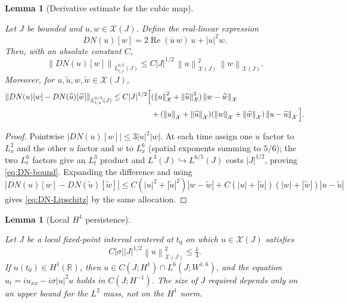 \documentclass[11pt,oneside]{book}
\providecommand{\uses}[1]{}
\newtheorem{lemma}[theorem]{Lemma}
\theoremstyle{definition}
\theoremstyle{remark}
\newcommand{\R}{\mathbb R}
\newcommand{\1}{\mathbf 1}
\newcommand{\Rea}{\operatorname{Re}}
\newcommand{\norm}[1]{\left\lVert #1\right\rVert}
\begin{document}
\begin{lemma}[Derivative estimate for the cubic map]
\label{lem:cubic-derivative-map}
\uses{def:fixed-point-space}
Let $J$ be bounded and $u,w\in\mathcal X(J)$. Define the real-linear expression
\[
 DN(u)[w]=2\Rea(\overline u\,w)\,u+|u|^2w.
\]
Then, with an absolute constant $C$,
\begin{equation}
 \norm{DN(u)[w]}_{L^{6/5}_{t,x}(J)}
 \le C|J|^{1/2}\,\norm u_{\mathcal X(J)}^2\,\norm w_{\mathcal X(J)}.
                                                    \label{eq:DN-bound}
\end{equation}
Moreover, for $u,\widetilde u,w,\widetilde w\in\mathcal X(J)$,
\begin{align}
 \norm{DN(u)[w]-DN(\widetilde u)[\widetilde w]}_{L^{6/5}_{t,x}(J)}
 \le C|J|^{1/2}\Big[&
 (\norm u_{\mathcal X}^2+\norm{\widetilde u}_{\mathcal X}^2)
 \norm{w-\widetilde w}_{\mathcal X}\notag\\
 &+(\norm u_{\mathcal X}+\norm{\widetilde u}_{\mathcal X})
 (\norm w_{\mathcal X}+\norm{\widetilde w}_{\mathcal X})
 \norm{u-\widetilde u}_{\mathcal X}\Big].          \label{eq:DN-Lipschitz}
\end{align}
\end{lemma}

\begin{proof}
\uses{lem:cubic-65}
Pointwise $|DN(u)[w]|\le 3|u|^2|w|$. At each time assign one $u$ factor to
$L^2_x$ and the other $u$ factor and $w$ to $L^6_x$ (spatial exponents summing
to $5/6$); the two $L^6_t$ factors give an $L^3_t$ product and
$L^3(J)\hookrightarrow L^{6/5}(J)$ costs $|J|^{1/2}$, proving
\eqref{eq:DN-bound}. Expanding the difference and using
$|DN(u)[w]-DN(\widetilde u)[\widetilde w]|
 \le C(|u|^2+|\widetilde u|^2)|w-\widetilde w|
   +C(|u|+|\widetilde u|)(|w|+|\widetilde w|)|u-\widetilde u|$
gives \eqref{eq:DN-Lipschitz} by the same allocation.
\end{proof}

\begin{lemma}[Local $H^1$ persistence]\label{lem:H1-persistence}
\uses{lem:cubic-derivative-map, lem:Wp-difference-quotient, def:fixed-point-space}
Let $J$ be a local fixed-point interval centered at $t_0$ on which
$u\in\mathcal X(J)$ satisfies
\begin{equation}
 C|\sigma||J|^{1/2}\norm u_{\mathcal X(J)}^2\le\tfrac14. \label{eq:H1-smallness}
\end{equation}
If $u(t_0)\in H^1(\R)$, then
$u\in C(J;H^1)\cap L^6(J;W^{1,6})$, and the equation
$u_t=iu_{xx}-i\sigma|u|^2u$ holds in $C(J;H^{-1})$. The size of $J$ required
depends only on an upper bound for the $L^2$ mass, not on the $H^1$ norm.
\end{lemma}
\end{document}
